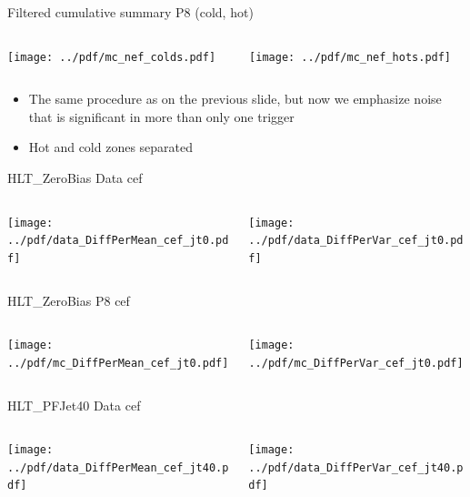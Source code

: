 \documentclass[9pt]{beamer}
\begin{document}
\begin{frame}[t]{Filtered cumulative summary P8 (cold, hot)}
\begin{columns}[T]
  \begin{column}{.5\textwidth}
  \texttt{[image: ../pdf/mc\_nef\_colds.pdf]}
  \end{column}
  \begin{column}{.5\textwidth}
  \texttt{[image: ../pdf/mc\_nef\_hots.pdf]}
  \end{column}
\end{columns}
\begin{itemize}
 \item The same procedure as on the previous slide, but now we emphasize noise that is significant in more than only one trigger
 \item Hot and cold zones separated
\end{itemize}
\end{frame}


\begin{frame}[t]{HLT\_ZeroBias Data cef}
\begin{columns}[T]
  \begin{column}{.5\textwidth}
  \texttt{[image: ../pdf/data\_DiffPerMean\_cef\_jt0.pdf]}
  \end{column}
  \begin{column}{.5\textwidth}
  \texttt{[image: ../pdf/data\_DiffPerVar\_cef\_jt0.pdf]}
  \end{column}
\end{columns}
\end{frame}

\begin{frame}[t]{HLT\_ZeroBias P8 cef}
\begin{columns}[T]
  \begin{column}{.5\textwidth}
  \texttt{[image: ../pdf/mc\_DiffPerMean\_cef\_jt0.pdf]}
  \end{column}
  \begin{column}{.5\textwidth}
  \texttt{[image: ../pdf/mc\_DiffPerVar\_cef\_jt0.pdf]}
  \end{column}
\end{columns}
\end{frame}
\begin{frame}[t]{HLT\_PFJet40 Data cef}
\begin{columns}[T]
  \begin{column}{.5\textwidth}
  \texttt{[image: ../pdf/data\_DiffPerMean\_cef\_jt40.pdf]}
  \end{column}
  \begin{column}{.5\textwidth}
  \texttt{[image: ../pdf/data\_DiffPerVar\_cef\_jt40.pdf]}
  \end{column}
\end{columns}
\end{frame}
\end{document}
